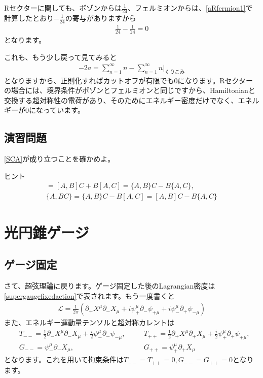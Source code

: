 \documentclass[report,paper=a4, fontsize=12pt, line_length=16cm, number_of_lines=34,dvipdfmx]{jlreq}
\numberwithin{equation}{chapter}
\numberwithin{equation}{section}
\newcommand{\del}{\partial}
\newcommand{\Lcal}{\mathcal{L}}
\begin{document}
Rセクターに関しても、ボゾンからは$\frac{1}{24}$、フェルミオンからは、\eqref{aRfermion1}で計算したとおり$-\frac{1}{24}$の寄与がありますから
\begin{align}
  \frac{1}{24}-\frac{1}{24}=0\label{supervacuumenergyR}
\end{align}
となります。

これも、もう少し戻って見てみると
\begin{align}
  -2a=\sum_{n=1}^{\infty}n-\sum_{n=1}^{\infty}n　\Bigg|_{\text{くりこみ}}
\end{align}
となりますから、正則化すればカットオフが有限でも$0$になります。Rセクターの場合には、境界条件がボゾンとフェルミオンと同じですから、Hamiltonianと交換する超対称性の電荷があり、そのためにエネルギー密度だけでなく、エネルギーが$0$になっています。

\subsection*{演習問題}
\eqref{SCA}が成り立つことを確かめよ。

ヒント
\begin{align}
  [A,BC]=[A,B]C+B[A,C]
   =\{A,B\}C-B\{A,C\},\\
  \{A,BC\}=\{A,B\}C-B[A,C]
  =[A,B]C-B\{A,C\}
\end{align}

\section{光円錐ゲージ}
\subsection{ゲージ固定}
さて、超弦理論に戻ります。ゲージ固定した後のLagrangian密度は\eqref{supergaugefixedaction}で表されます。もう一度書くと
\begin{align}
    \Lcal = \frac{1}{2\pi}\left( 
      \del_{+}X^{\mu}\del_{-}X_{\mu}+i\psi^{\mu}_{+}\del_{-}\psi_{+\mu}
      +i\psi^{\mu}_{-}\del_{+}\psi_{-\mu}
     \right)
     \label{supergaugefixedaction2}
\end{align}
また、エネルギー運動量テンソルと超対称カレントは
\begin{align}
  &
T_{--}=\frac12\del_{-}X^{\mu}\del_{-}X_{\mu}+\frac{i}{2}\psi^{\mu}_{-}\del_{-}\psi_{-\mu}
  ,\quad &&
T_{++}=\frac12\del_{+}X^{\mu}\del_{+}X_{\mu}+\frac{i}{2}\psi^{\mu}_{+}\del_{+}\psi_{+\mu}
,\nonumber\\
&
G_{--}=\psi^{\mu}_{-}\del_{-}X_{\mu}
,&&
G_{++}=\psi^{\mu}_{+}\del_{+}X_{\mu}
\end{align}    
となります。これを用いて拘束条件は$T_{--}=T_{++}=0,G_{--}=G_{++}=0$となります。
\end{document}
